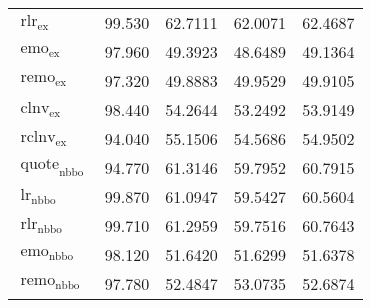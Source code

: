 \begin{table}[H]
\begin{tabular}{lSSSS}
        $\operatorname{rlr}_{\mathrm{ex}}$                                                                                    & 99.530            & 62.7111                            & 62.0071           & 62.4687           \\
        $\operatorname{emo}_{\mathrm{ex}}$                                                                                    & 97.960            & 49.3923                            & 48.6489           & 49.1364           \\
        $\operatorname{remo}_{\mathrm{ex}}$                                                                                   & 97.320            & 49.8883                            & 49.9529           & 49.9105           \\
        $\operatorname{clnv}_{\mathrm{ex}}$                                                                                   & 98.440            & 54.2644                            & 53.2492           & 53.9149           \\
        $\operatorname{rclnv}_{\mathrm{ex}}$                                                                                  & 94.040            & 55.1506                            & 54.5686           & 54.9502           \\\midrule
        $\operatorname{quote}_{\mathrm{nbbo}}$                                                                                & 94.770            & 61.3146                            & 59.7952           & 60.7915           \\
        $\operatorname{lr}_{\mathrm{nbbo}}$                                                                                   & 99.870            & 61.0947                            & 59.5427           & 60.5604           \\
        $\operatorname{rlr}_{\mathrm{nbbo}}$                                                                                  & 99.710            & 61.2959                            & 59.7516           & 60.7643           \\
        $\operatorname{emo}_{\mathrm{nbbo}}$                                                                                  & 98.120            & 51.6420                            & 51.6299           & 51.6378           \\
        $\operatorname{remo}_{\mathrm{nbbo}}$                                                                                 & 97.780            & 52.4847                            & 53.0735           & 52.6874           \\

\end{tabular}
\end{table}
